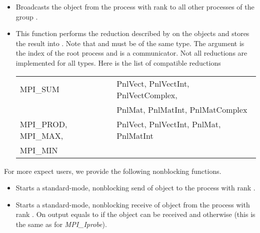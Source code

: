 \begin{itemize}
  
\item {}
  \sshortdescribe Broadcasts the object  from the process with rank
   to all other processes of the group .

\item {}
  \sshortdescribe This function performs the reduction described by  on
  the objects  and stores the result into . Note that
   and  must be of the same type. The argument
   is the index of the root process and  is a communicator.
  Not all reductions are implemented for all types. Here is the list of
  compatible reductions

  \begin{center}
  \begin{tabular}{l@{\hskip 1em}|@{\hskip 1em}l}

    MPI_SUM            & PnlVect, PnlVectInt, PnlVectComplex, \\
                       & PnlMat, PnlMatInt, PnlMatComplex \\
    \hline
    MPI_PROD, MPI_MAX, & PnlVect, PnlVectInt, PnlMat, PnlMatInt \\
    MPI_MIN            & 
  \end{tabular}
  \end{center}
\end{itemize}

For more expect users, we provide the following nonblocking functions.
\begin{itemize}
\item {}
  \sshortdescribe Starts a standard-mode, nonblocking send of object
   to the process with rank .
  
  
\item {}
  \sshortdescribe Starts a standard-mode, nonblocking receive of object
   from the process with rank . On output  equals
  to  if the object can be received and  otherwise (this
  is the same as for {\it MPI_Iprobe}).
\end{itemize}

